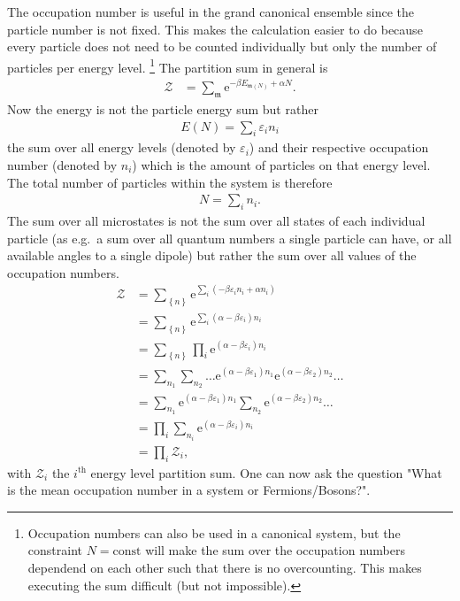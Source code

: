\documentclass[a4paper,10pt]{article}
\numberwithin{equation}{section}
\begin{document}
\begin{multicols}{2}
The occupation number is useful in the grand canonical ensemble since the particle number is not fixed.
This makes the calculation easier to do because every particle does not need to be counted individually but only the number of particles per energy level.
\footnote{Occupation numbers can also be used in a canonical system, but the constraint $N=\text{const}$ will make the sum over the occupation numbers dependend on each other such that there is no overcounting.
This makes executing the sum difficult (but not impossible).}
The partition sum in general is
\begin{align} 
  \mathcal{Z} &= \sum_{\mathfrak{m}}^{}\text{e}^{-\beta E_{\mathfrak{m}(N)}+\alpha N}
.\end{align} 
Now the energy is not the particle energy sum but rather
\begin{align} 
  E(N)=\sum_{i}^{}\varepsilon _i n_i
\end{align} 
the sum over all energy levels (denoted by $\varepsilon _i$) and their respective occupation number (denoted by $n_i$) which is the amount of particles on that energy level.
The total number of particles within the system is therefore
\begin{align} 
  N=\sum_{i}^{}n_i
.\end{align} 
The sum over all microstates is not the sum over all states of each individual particle (as e.g.\ a sum over all quantum numbers a single particle can have, or all available angles to a single dipole) but rather the sum over all values of the occupation numbers.
\begin{align} 
  \mathcal{Z} &= \sum_{ \left\{n\right\}}^{}\text{e}^{\sum_{i}^{}(-\beta \varepsilon _i n_i+\alpha n_i)}\\
              &= \sum_{ \left\{n\right\}}^{}\text{e}^{\sum_{i}^{}(\alpha -\beta \varepsilon _i)n_i}\\
              &= \sum_{ \left\{n\right\}}^{}\prod_{i}^{}\text{e}^{(\alpha -\beta \varepsilon _i)n_i}\\
              &= \sum_{n_1}^{}\sum_{n_2}^{}\hdots \text{e}^{(\alpha -\beta \varepsilon _1)n_1}\text{e}^{(\alpha -\beta \varepsilon _2)n_2}\hdots \\
              &= \sum_{n_1}^{}\text{e}^{(\alpha -\beta \varepsilon _1)n_1}\sum_{n_2}^{}\text{e}^{(\alpha -\beta \varepsilon _2)n_2}\hdots \\
              &= \prod_{i}^{}\sum_{n_i}^{}\text{e}^{(\alpha -\beta \varepsilon _i)n_i}\\
              &= \prod_{i}^{}\mathcal{Z}_i
,\end{align} 
with $\mathcal{Z}_i$ the $i^{\text{th}}$ energy level partition sum.
One can now ask the question "What is the mean occupation number in a system or Fermions/Bosons?".


\end{multicols}
\end{document}
